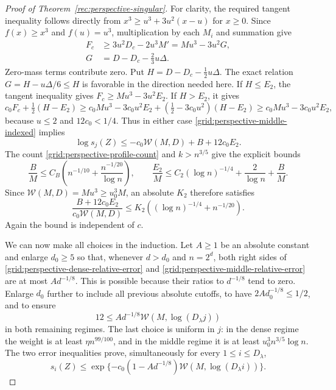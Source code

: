 \begin{proof}[Proof of Theorem~\ref{rec:perspective-singular}]
For clarity, the required tangent inequality follows directly
from $x^3\ge u^3+3u^2(x-u)$ for $x\ge0$.
Since $f(x)\ge x^3$ and $f(u)=u^3$, multiplication by each
$M_i$ and summation give
\begin{equation}\label{grid:perspective-middle-tangent}
 \begin{split}
 F_c&\ge3u^2D_c-2u^3M'
      =Mu^3-3u^2G,\\
 G&=D-D_c-\tfrac23u\Delta.
 \end{split}
\end{equation}
Zero-mass terms contribute zero.  Put
$H=D-D_c-\tfrac12u\Delta$.  The exact relation
$G=H-u\Delta/6\le H$ is favorable in the direction needed here.
If $H\le E_2$, the tangent inequality gives
$F_c\ge Mu^3-3u^2E_2$.  If $H>E_2$, it gives
\[
 c_0F_c+\tfrac12(H-E_2)
 \ge c_0Mu^3-3c_0u^2E_2
       +(\tfrac12-3c_0u^2)(H-E_2)
 \ge c_0Mu^3-3c_0u^2E_2,
\]
because $u\le2$ and $12c_0<1/4$.  Thus in either case
\eqref{grid:perspective-middle-indexed} implies
\begin{equation}\label{grid:perspective-middle-error}
 \log s_j(Z)\le-c_0\mathcal W(M,D)+B+12c_0E_2.
\end{equation}
The count \eqref{grid:perspective-profile-count} and
$k>n^{3/5}$ give the explicit bounds
\[
 \frac{B}{M}
 \le C_B\left(n^{-1/10}+\frac{n^{-1/20}}{\log n}\right),
 \qquad
 \frac{E_2}{M}
 \le C_2(\log n)^{-1/4}+\frac2{\log n}+\frac BM.
\]
Since $\mathcal W(M,D)=Mu^3\ge u_0^3M$, an absolute $K_2$
therefore satisfies
\begin{equation}\label{grid:perspective-middle-relative-error}
 \frac{B+12c_0E_2}{c_0\mathcal W(M,D)}
 \le K_2\left((\log n)^{-1/4}+n^{-1/20}\right).
\end{equation}
Again the bound is independent of $c$.

We can now make all choices in the induction.  Let $A\ge1$ be
an absolute constant and enlarge $d_0\ge5$ so that, whenever
$d>d_0$ and $n=2^d$, both right sides of
\eqref{grid:perspective-dense-relative-error} and
\eqref{grid:perspective-middle-relative-error} are at most
$Ad^{-1/8}$.  This is possible because their ratios to
$d^{-1/8}$ tend to zero.  Enlarge $d_0$ further to include all
previous absolute cutoffs, to have $2Ad_0^{-1/8}\le1/2$, and
to ensure
\begin{equation}\label{grid:perspective-top-index-error}
 12\le Ad^{-1/8}\mathcal W(M,\log(D_\lambda j))
\end{equation}
in both remaining regimes.  The last choice is uniform in $j$:
in the dense regime the weight is at least $\eta n^{99/100}$,
and in the middle regime it is at least
$u_0^3n^{3/5}\log n$.  The two error inequalities prove,
simultaneously for every $1\le i\le D_\lambda$,
\begin{equation}\label{grid:perspective-powered-final}
 s_i(Z)\le
 \exp\{-c_0(1-Ad^{-1/8})
              \mathcal W(M,\log(D_\lambda i))\}.
\end{equation}


\end{proof}
